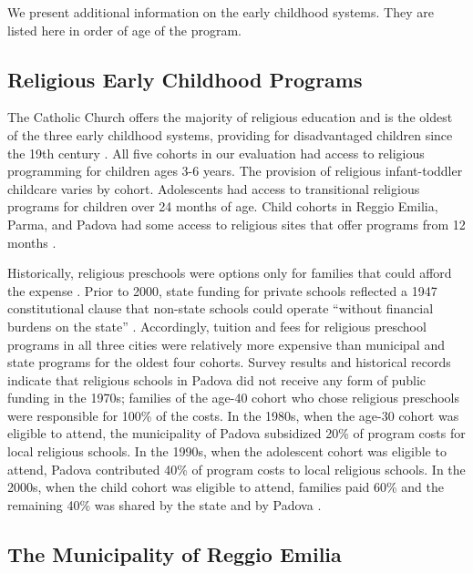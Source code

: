We present additional information on the early childhood systems. They are listed here in order of age of the program.

\subsection{Religious Early Childhood Programs}

The Catholic Church offers the majority of religious education and is the oldest of the three early childhood systems, providing for disadvantaged children since the 19th century \citep{OECD_2001_Italy-Country-Note}. All five cohorts in our evaluation had access to religious programming for children ages 3-6 years. The provision of religious infant-toddler childcare varies by cohort. Adolescents had access to transitional religious programs for children over 24 months of age. Child cohorts in Reggio Emilia, Parma, and Padova had some access to religious sites that offer programs from 12 months \citep{Malizia-Cicatelli_2011_BOOK_Catholic-School}.

Historically, religious preschools were options only for families that could afford the expense \citep{Hohnerlein_2009_Paradox-Public-Preschools,Ribolzi_2013_Italy}. Prior to 2000, state funding for private schools reflected a 1947 constitutional clause that non-state schools could operate ``without financial burdens on the state'' \citep{Hohnerlein_2009_Paradox-Public-Preschools}. Accordingly, tuition and fees for religious preschool programs in all three cities were relatively more expensive than municipal and state programs for the oldest four cohorts. Survey results and historical records indicate that religious schools in Padova did not receive any form of public funding in the 1970s; families of the age-40 cohort who chose religious preschools were responsible for 100\% of the costs. In the 1980s, when the age-30 cohort was eligible to attend, the municipality of Padova subsidized 20\% of program costs for local religious schools. In the 1990s, when the adolescent cohort was eligible to attend, Padova contributed 40\% of program costs to local religious schools. In the 2000s, when the child cohort was eligible to attend, families paid 60\% and the remaining 40\% was shared by the state and by Padova \citep{Reggio-Admin-data_1966-2006, Reggio-Annual-Journals_1994-2011, Padova-Admin-Data_1964-2011,CEHD_2016_Historical-Analysis}.

\subsection{The Municipality of Reggio Emilia}

